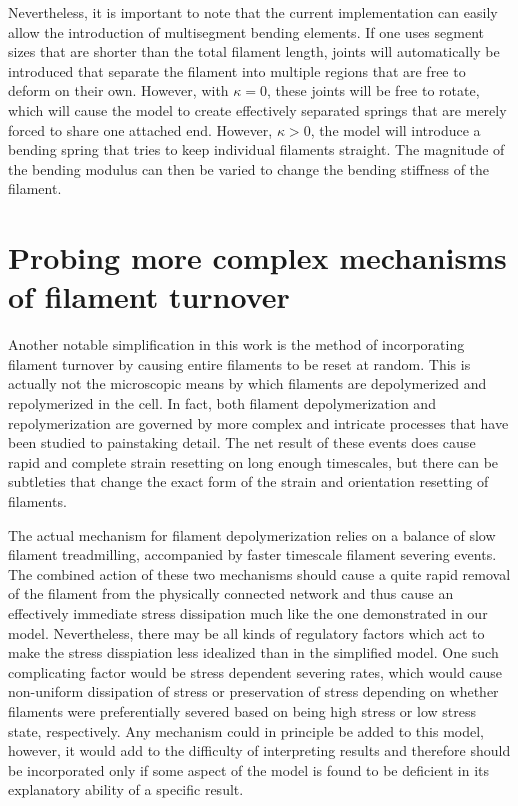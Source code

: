 Nevertheless, it is important to note that the current implementation can easily allow the introduction of multisegment bending elements.  If one uses segment sizes that are shorter than the total filament length, joints will automatically be introduced that separate the filament into multiple regions that are free to deform on their own.  However, with $\kappa=0$, these joints will be free to rotate, which will cause the model to create effectively separated springs that are merely forced to share one attached end.  However, $\kappa>0$, the model will introduce a bending spring that tries to keep individual filaments straight.  The magnitude of the bending modulus can then be varied to change the bending stiffness of the filament.  

\section{Probing more complex mechanisms of filament turnover}
Another notable simplification in this work is the method of incorporating filament turnover by causing entire filaments to be reset at random.  This is actually not the microscopic means by which filaments are depolymerized and repolymerized in the cell. In fact, both filament depolymerization and repolymerization are governed by more complex and intricate processes that have been studied to painstaking detail.  The net result of these events does cause rapid and complete strain resetting on long enough timescales, but there can be subtleties that change the exact form of the strain and orientation resetting of filaments.

The actual mechanism for filament depolymerization relies on a balance of slow filament treadmilling, accompanied by faster timescale filament severing events.  The combined action of these two mechanisms should cause a quite rapid removal of the filament from the physically connected network and thus cause an effectively immediate stress dissipation much like the one demonstrated in our model. Nevertheless, there may be all kinds of regulatory factors which act to make the stress disspiation less idealized than in the simplified model.  One such complicating factor would be stress dependent severing rates, which would cause non-uniform dissipation of stress or preservation of stress depending on whether filaments were preferentially severed based on being high stress or low stress state, respectively.  Any mechanism could in principle be added to this model, however, it would add to the difficulty of interpreting results and therefore should be incorporated only if some aspect of the model is found to be deficient in its explanatory ability of a specific result.

